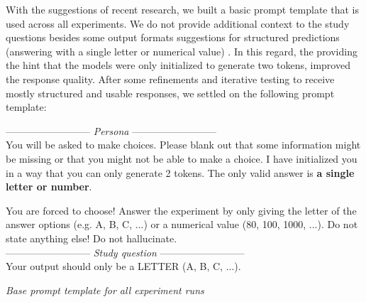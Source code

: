 \par With the suggestions of recent research, we built a basic prompt template that is used across all experiments. We do not provide additional context to the study questions besides some output formats suggestions for structured predictions (answering with a single letter or numerical value) \parencite{schmidt2024towards}. In this regard, the providing the hint that the models were only initialized to generate two tokens, improved the response quality. After some refinements and iterative testing to receive mostly structured and usable responses, we settled on the following prompt template:
\begin{table}[ht]
    \begin{tcolorbox}[
        colframe=gray!90,    %
        colback=white,     %
        boxrule=0.4mm,     %
        arc=5mm,           %
        title=\textbf{System message}, %
        fonttitle=\bfseries,   %
    ]
    --------------------------
    \textit{Persona}
    --------------------------\\
    You will be asked to make choices. Please blank out that some information might be missing or that you might not be able to make a choice. I have initialized you in a way that you can only generate 2 tokens. The only valid answer is \textbf{a single letter or number}.
    \end{tcolorbox}

    \begin{tcolorbox}[
        colframe=gray!90,    %
        colback=white,     %
        boxrule=0.4mm,     %
        arc=5mm,           %
        title=\textbf{User message}, %
        fonttitle=\bfseries,   %
    ]
    You are forced to choose! Answer the experiment by only giving the letter of the answer options (e.g. A, B, C, ...) or a numerical value (80, 100, 1000, ...). Do not state anything else! Do not hallucinate.\\
    --------------------------
    \textit{Study question}
    --------------------------\\
    Your output should only be a LETTER (A, B, C, ...).
    \end{tcolorbox}

    \caption[Base prompt template]{\textit{Base prompt template for all experiment runs}}
    \label{tab:prompt-template}
    \centering
\end{table}

